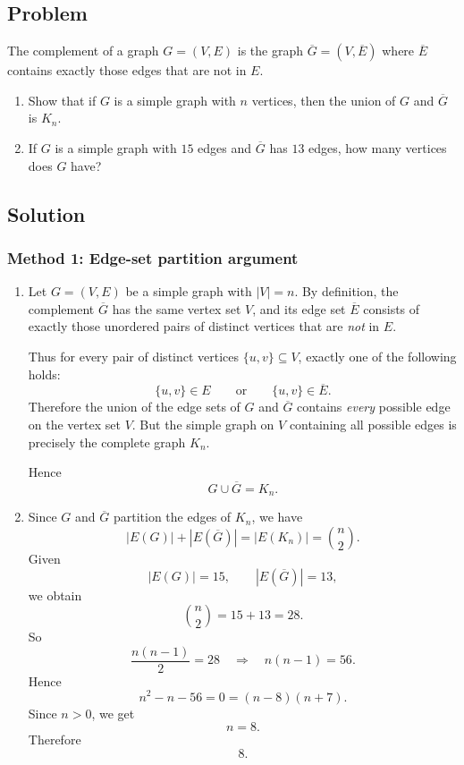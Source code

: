 \documentclass[12pt]{article}
\newcommand{\comp}[1]{\overline{#1}}
\begin{document}
\subsection{Problem}
The complement of a graph \(G=(V,E)\) is the graph \(\comp{G}=(V,\overline{E})\) where \(\overline{E}\) contains exactly those edges that are not in \(E\).

\begin{enumerate}[label=(\alph*)]
\item Show that if \(G\) is a simple graph with \(n\) vertices, then the union of \(G\) and \(\comp{G}\) is \(K_n\).
\item If \(G\) is a simple graph with \(15\) edges and \(\comp{G}\) has \(13\) edges, how many vertices does \(G\) have?
\end{enumerate}

\subsection{Solution}

\subsubsection{Method 1: Edge-set partition argument}
\begin{enumerate}[label=(\alph*)]
\item Let \(G=(V,E)\) be a simple graph with \(|V|=n\). By definition, the complement \(\comp{G}\) has the same vertex set \(V\), and its edge set \(\overline{E}\) consists of exactly those unordered pairs of distinct vertices that are \emph{not} in \(E\).

Thus for every pair of distinct vertices \(\{u,v\}\subseteq V\), exactly one of the following holds:
\[
\{u,v\}\in E
\qquad\text{or}\qquad
\{u,v\}\in \overline{E}.
\]
Therefore the union of the edge sets of \(G\) and \(\comp{G}\) contains \emph{every} possible edge on the vertex set \(V\). But the simple graph on \(V\) containing all possible edges is precisely the complete graph \(K_n\).

Hence
\[
\boxed{G\cup \comp{G}=K_n.}
\]

\item Since \(G\) and \(\comp{G}\) partition the edges of \(K_n\), we have
\[
|E(G)|+|E(\comp{G})|=|E(K_n)|=\binom{n}{2}.
\]
Given
\[
|E(G)|=15,\qquad |E(\comp{G})|=13,
\]
we obtain
\[
\binom{n}{2}=15+13=28.
\]
So
\[
\frac{n(n-1)}{2}=28
\quad\Longrightarrow\quad
n(n-1)=56.
\]
Hence
\[
n^2-n-56=0=(n-8)(n+7).
\]
Since \(n>0\), we get
\[
n=8.
\]
Therefore
\[
\boxed{8.}
\]
\end{enumerate}
\end{document}
